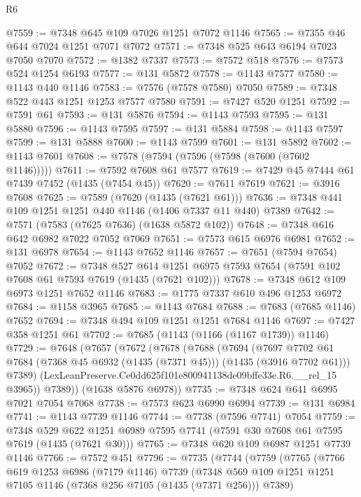 \begin{lexlean}{R6}
\begin{coremodule}
@7559 := @7348 @645 @109 @7026 @1251 @7072 @1146
@7565 := @7355 @46 @644 @7024 @1251 @7071 @7072
@7571 := @7348 @525 @643 @6194 @7023 @7050 @7070
@7572 := @1382 @7337
@7573 := @7572 @518
@7576 := @7573 @524 @1254 @6193
@7577 := @131 @5872
@7578 := @1143 @7577
@7580 := @1143 @440 @1146
@7583 := @7576 (@7578 @7580) @7050
@7589 := @7348 @522 @443 @1251 @1253 @7577 @7580
@7591 := @7427 @520 @1251
@7592 := @7591 @61
@7593 := @131 @5876
@7594 := @1143 @7593
@7595 := @131 @5880
@7596 := @1143 @7595
@7597 := @131 @5884
@7598 := @1143 @7597
@7599 := @131 @5888
@7600 := @1143 @7599
@7601 := @131 @5892
@7602 := @1143 @7601
@7608 := @7578 (@7594 (@7596 (@7598 (@7600 (@7602 @1146)))))
@7611 := @7592 @7608 @61 @7577
@7619 := @7429 @45 @7444 @61 @7439 @7452 (@1435 (@7454 @45))
@7620 := @7611 @7619
@7621 := @3916 @7608
@7625 := @7589 (@7620 (@1435 (@7621 @61)))
@7636 := @7348 @441 @109 @1251 @1251 @440 @1146 (@1406 @7337 @11 @440) @7389
@7642 := @7571 (@7583 (@7625 @7636) (@1638 @5872 @102))
@7648 := @7348 @616 @642 @6982 @7022 @7052 @7069
@7651 := @7573 @615 @6976 @6981
@7652 := @131 @6978
@7654 := @1143 @7652 @1146
@7657 := @7651 (@7594 @7654) @7052
@7672 := @7348
    @527
    @614
    @1251
    @6975
    @7593
    @7654
    (@7591 @102 @7608 @61 @7593 @7619 (@1435 (@7621 @102)))
@7678 := @7348 @612 @109 @6973 @1251 @7652 @1146
@7683 := @1775 @7337 @610 @496 @1253 @6972
@7684 := @1158 @3965
@7685 := @1143 @7684
@7688 := @7683 (@7685 @1146) @7652
@7694 := @7348 @494 @109 @1251 @1251 @7684 @1146
@7697 := @7427 @358 @1251 @61
@7702 := @7685 (@1143 (@1166 (@1167 @1739)) @1146)
@7729 := @7648
    (@7657
      (@7672
        (@7678
          (@7688
            (@7694
              (@7697
                @7702
                @61
                @7684
                (@7368 @45 @6932 (@1435 (@7371 @45)))
                (@1435 (@3916 @7702 @61)))
              @7389)
            (LexLeanPreserve.Ce0dd625f101e800941138de09bffe33e.R6.__rel_15 @3965))
          @7389))
      (@1638 @5876 @6978))
@7735 := @7348 @624 @641 @6995 @7021 @7054 @7068
@7738 := @7573 @623 @6990 @6994
@7739 := @131 @6984
@7741 := @1143 @7739 @1146
@7744 := @7738 (@7596 @7741) @7054
@7759 := @7348
    @529
    @622
    @1251
    @6989
    @7595
    @7741
    (@7591 @30 @7608 @61 @7595 @7619 (@1435 (@7621 @30)))
@7765 := @7348 @620 @109 @6987 @1251 @7739 @1146
@7766 := @7572 @451
@7796 := @7735
    (@7744
      (@7759
        (@7765
          (@7766
            @619
            @1253
            @6986
            (@7179 @1146)
            @7739
            (@7348 @569 @109 @1251 @1251 @7105 @1146 (@7368 @256 @7105 (@1435 (@7371 @256))) @7389)

\end{coremodule}
\end{lexlean}
